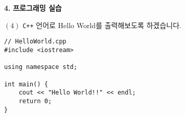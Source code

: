 \begin{flushleft}
    {\setmainfont[Path=FONT/]{KOPUBWORLD_DOTUM_PRO_BOLD.OTF}\textcolor{skyblue2}{{\huge\textbf{4.}}}}
    {\textcolor{skyblue2}{{\huge\textbf{프로그래밍 실습}}}}
\end{flushleft}

\begin{flushleft}
    $(4)$ \texttt{C++} 언어로 Hello World를 출력해보도록 하겠습니다.
\end{flushleft}

\begin{lstlisting}
// HelloWorld.cpp
#include <iostream>

using namespace std;

int main() {
    cout << "Hello World!!" << endl;
    return 0;
}
\end{lstlisting}